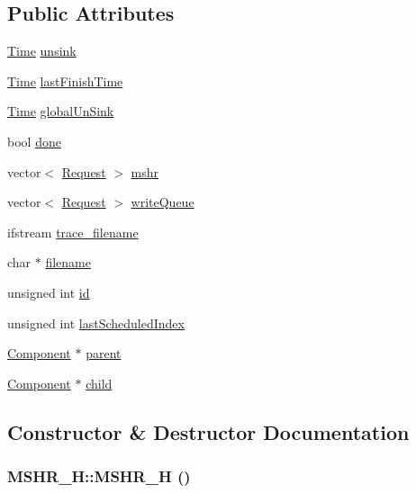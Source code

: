 \subsection*{Public Attributes}
\begin{CompactItemize}
\item 
\hyperlink{constants_8h_a475e5c84e5eb0fe317942dc62553f7e}{Time} \hyperlink{classMSHR__H_9e26b7281b5d4ec954954209aae9ebfa}{unsink}
\item 
\hyperlink{constants_8h_a475e5c84e5eb0fe317942dc62553f7e}{Time} \hyperlink{classMSHR__H_adfd06c0a14ec47c72e3b3e0c436d62e}{lastFinishTime}
\item 
\hyperlink{constants_8h_a475e5c84e5eb0fe317942dc62553f7e}{Time} \hyperlink{classMSHR__H_08f7e602a70bcf8d0e991d46e19265a2}{globalUnSink}
\item 
bool \hyperlink{classMSHR__H_4cd1713ebd3ab9038ed231781b4bc36a}{done}
\item 
vector$<$ \hyperlink{classRequest}{Request} $>$ \hyperlink{classMSHR__H_a46028543e0902980f6732c2ec1460e1}{mshr}
\item 
vector$<$ \hyperlink{classRequest}{Request} $>$ \hyperlink{classMSHR__H_4b93a7397177a907d0ee3a3cebcbbbda}{writeQueue}
\item 
ifstream \hyperlink{classMSHR__H_6e19d2203f1ad9bf624596e00d600516}{trace\_\-filename}
\item 
char $\ast$ \hyperlink{classMSHR__H_1121ad69747b53dbe515b58094ac7f08}{filename}
\item 
unsigned int \hyperlink{classMSHR__H_97b745c7aeca64268c19411dd6ba5354}{id}
\item 
unsigned int \hyperlink{classMSHR__H_fd269df00bf476b2b151516b64cf7388}{lastScheduledIndex}
\item 
\hyperlink{classComponent}{Component} $\ast$ \hyperlink{classMSHR__H_db1067e0a44f5878fe6c1b7c437f9d93}{parent}
\item 
\hyperlink{classComponent}{Component} $\ast$ \hyperlink{classMSHR__H_66d8569d9e2ea71eb62ef9478761db02}{child}
\end{CompactItemize}


\subsection{Constructor \& Destructor Documentation}
\hypertarget{classMSHR__H_ed75aac9537ffb4d5814b337c1099e82}{
\subsubsection[{MSHR\_\-H}]{\setlength{\rightskip}{0pt plus 5cm}MSHR\_\-H::MSHR\_\-H ()}}
\label{classMSHR__H_ed75aac9537ffb4d5814b337c1099e82}


